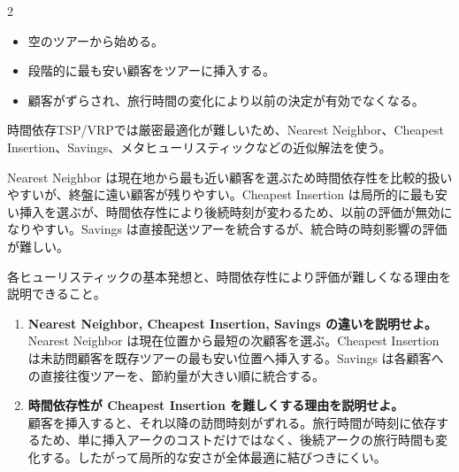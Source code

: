 \clearpage



\vspace{1.5mm}

\begin{multicols}{2}

\footnotesize

\raggedcolumns


\begin{itemize}
\item 空のツアーから始める。
\item 段階的に最も安い顧客をツアーに挿入する。
\item 顧客がずらされ、旅行時間の変化により以前の決定が有効でなくなる。
\end{itemize}

時間依存TSP/VRPでは厳密最適化が難しいため、Nearest Neighbor、Cheapest Insertion、Savings、メタヒューリスティックなどの近似解法を使う。\par

Nearest Neighbor は現在地から最も近い顧客を選ぶため時間依存性を比較的扱いやすいが、終盤に遠い顧客が残りやすい。Cheapest Insertion は局所的に最も安い挿入を選ぶが、時間依存性により後続時刻が変わるため、以前の評価が無効になりやすい。Savings は直接配送ツアーを統合するが、統合時の時刻影響の評価が難しい。\par

各ヒューリスティックの基本発想と、時間依存性により評価が難しくなる理由を説明できること。\par


\begin{enumerate}
\item \textbf{Nearest Neighbor, Cheapest Insertion, Savings の違いを説明せよ。}\\
Nearest Neighbor は現在位置から最短の次顧客を選ぶ。Cheapest Insertion は未訪問顧客を既存ツアーの最も安い位置へ挿入する。Savings は各顧客への直接往復ツアーを、節約量が大きい順に統合する。
\item \textbf{時間依存性が Cheapest Insertion を難しくする理由を説明せよ。}\\
顧客を挿入すると、それ以降の訪問時刻がずれる。旅行時間が時刻に依存するため、単に挿入アークのコストだけではなく、後続アークの旅行時間も変化する。したがって局所的な安さが全体最適に結びつきにくい。
\end{enumerate}

\end{multicols}

